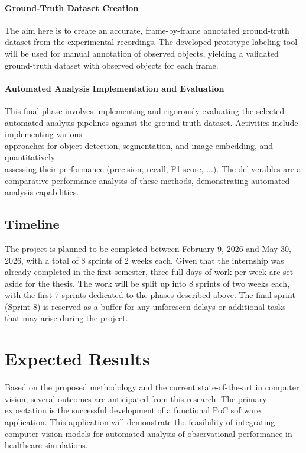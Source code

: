 \documentclass[english]{hogent-article}
\begin{document}
\paragraph{Ground-Truth Dataset Creation\\}
The aim here is to create an accurate, frame-by-frame annotated ground-truth dataset from the experimental recordings. 
The developed prototype labeling tool will be used for manual annotation of observed objects, 
yielding a validated ground-truth dataset with observed objects for each frame.

\paragraph{Automated Analysis Implementation and Evaluation\\}
This final phase involves implementing and rigorously evaluating the selected automated analysis pipelines 
against the ground-truth dataset.
Activities include implementing various\\ approaches for object detection, segmentation, and image embedding, and quantitatively\\
assessing their performance (precision, recall, F1-score, ...).
The deliverables are a comparative performance analysis of these methods, demonstrating automated analysis capabilities.

\subsection{Timeline}

The project is planned to be completed between February 9, 2026 and May 30, 2026, with a total of 8 sprints of 2 weeks each.
Given that the internship was already completed in the first semester, three full days of work per week are set aside for the thesis.
The work will be split up into 8 sprints of two weeks each, with the first 7 sprints dedicated to the phases described above.
The final sprint (Sprint 8) is reserved as a buffer for any unforeseen delays or additional tasks that may arise during the project.

\section{Expected Results}
\label{sec:expected-results}

Based on the proposed methodology and the current state-of-the-art in computer vision, several outcomes are anticipated from this research.
The primary expectation is the successful development of a functional PoC software application. 
This application will demonstrate the feasibility of integrating computer vision models for automated analysis of observational performance in healthcare simulations.
\end{document}

